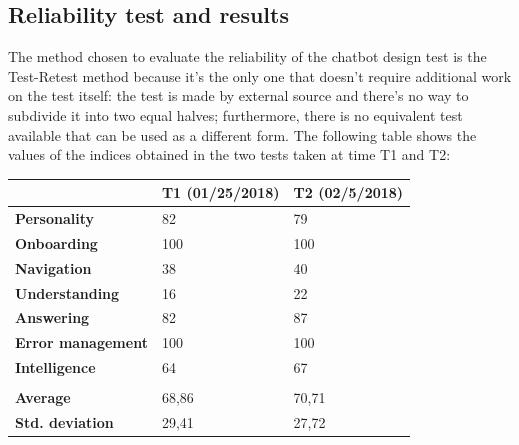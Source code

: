 \documentclass[b5paper,10pt,twoside,cucitura]{toptesi}
\begin{document}
\subsection{Reliability test and results}

The method chosen to evaluate the reliability of the chatbot design test is the Test-Retest method because it's the only one that doesn't require additional work on the test itself: the test is made by external source and there's no way to subdivide it into two equal halves; furthermore, there is no equivalent test available that can be used as a different form.
The following table shows the values of the indices obtained in the two tests taken at time T1 and T2:
\pagebreak

\begin{table}[]
\centering
\begin{tabular}{|l|l|l|l|}
\hline
\multicolumn{2}{|l|}{}                          & \textbf{T1 (01/25/2018)} & \textbf{T2 (02/5/2018)} \\ \hline
\multicolumn{2}{|l|}{\textbf{Personality}}      & 82                       & 79                      \\ \hline
\multicolumn{2}{|l|}{\textbf{Onboarding}}       & 100                      & 100                     \\ \hline
\multicolumn{2}{|l|}{\textbf{Navigation}}       & 38                       & 40                      \\ \hline
\multicolumn{2}{|l|}{\textbf{Understanding}}    & 16                       & 22                      \\ \hline
\multicolumn{2}{|l|}{\textbf{Answering}}        & 82                       & 87                      \\ \hline
\multicolumn{2}{|l|}{\textbf{Error management}} & 100                      & 100                     \\ \hline
\multicolumn{2}{|l|}{\textbf{Intelligence}}     & 64                       & 67                      \\ \hline
\multicolumn{2}{|l|}{}                          &                          &                         \\ \hline
\multicolumn{2}{|l|}{\textbf{Average}}          & 68,86                    & 70,71                   \\ \hline
\multicolumn{2}{|l|}{\textbf{Std. deviation}}   & 29,41                    & 27,72                   \\ \hline
\end{tabular}
\end{table}
\end{document}
